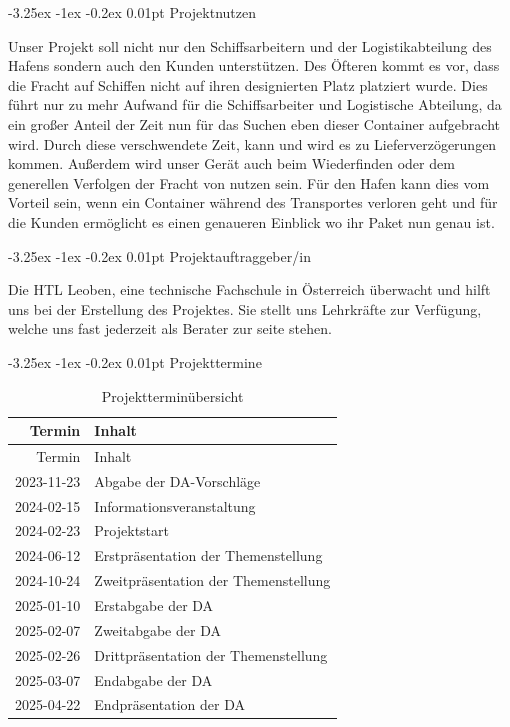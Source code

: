 \documentclass[
    headings=optiontotocandhead,%
    twoside,
    numbers=noenddot,%
    12pt, %
    titlepage, %
    parskip=full, %
    listof=leveldown, 
    numbers=noenddot, %
    a4paper,DIV=14,
    BCOR=15mm,
]{scrbook}
\makeatletter
\renewcommand\paragraph{\@startsection{paragraph}{4}{\z@}%
    {-3.25ex \@plus -1ex \@minus -0.2ex}%
    {0.01pt}%
    {\raggedsection\normalfont\sectfont\nobreak\size@paragraph}%
  }
\makeatother
\begin{document}
\hypertarget{projektnutzen}{%
\paragraph{Projektnutzen}\label{projektnutzen}}

Unser Projekt soll nicht nur den Schiffsarbeitern und der
Logistikabteilung des Hafens sondern auch den Kunden unterstützen. Des
Öfteren kommt es vor, dass die Fracht auf Schiffen nicht auf ihren
designierten Platz platziert wurde. Dies führt nur zu mehr Aufwand für
die Schiffsarbeiter und Logistische Abteilung, da ein großer Anteil der
Zeit nun für das Suchen eben dieser Container aufgebracht wird. Durch
diese verschwendete Zeit, kann und wird es zu Lieferverzögerungen
kommen. Außerdem wird unser Gerät auch beim Wiederfinden oder dem
generellen Verfolgen der Fracht von nutzen sein. Für den Hafen kann dies
vom Vorteil sein, wenn ein Container während des Transportes verloren
geht und für die Kunden ermöglicht es einen genaueren Einblick wo ihr
Paket nun genau ist.

\hypertarget{projektauftraggeberin}{%
\paragraph{Projektauftraggeber/in}\label{projektauftraggeberin}}

Die HTL Leoben, eine technische Fachschule in Österreich überwacht und
hilft uns bei der Erstellung des Projektes. Sie stellt uns Lehrkräfte
zur Verfügung, welche uns fast jederzeit als Berater zur seite stehen.

\hypertarget{projekttermine}{%
\paragraph{Projekttermine}\label{projekttermine}}

\begin{longtable}[]{@{}rl@{}}
\caption{Projektterminübersicht}\tabularnewline
\toprule
Termin & Inhalt\tabularnewline
\midrule
\endfirsthead
\toprule
Termin & Inhalt\tabularnewline
\midrule
\endhead
2023-11-23 & Abgabe der DA-Vorschläge\tabularnewline
2024-02-15 & Informationsveranstaltung\tabularnewline
2024-02-23 & Projektstart\tabularnewline
2024-06-12 & Erstpräsentation der Themenstellung\tabularnewline
2024-10-24 & Zweitpräsentation der Themenstellung\tabularnewline
2025-01-10 & Erstabgabe der DA\tabularnewline
2025-02-07 & Zweitabgabe der DA\tabularnewline
2025-02-26 & Drittpräsentation der Themenstellung\tabularnewline
2025-03-07 & Endabgabe der DA\tabularnewline
2025-04-22 & Endpräsentation der DA\tabularnewline
\bottomrule
\end{longtable}
\end{document}

